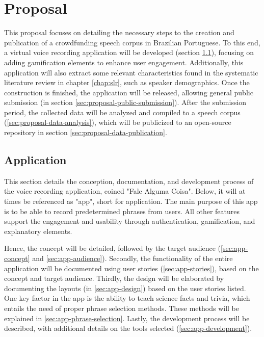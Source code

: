\chapter[Proposal]{Proposal}

This proposal focuses on detailing the necessary steps to the creation and publication of a crowdfunding speech corpus in Brazilian Portuguese. To this end, a virtual voice recording application will be developed (section \ref{sec:proposal-app}), focusing on adding gamification elements to enhance user engagement. Additionally, this application will also extract some relevant characteristics found in the systematic literature review in chapter \ref{chap:slr}, such as speaker demographics. Once the construction is finished, the application will be released, allowing general public submission (in section \ref{sec:proposal-public-submission}). After the submission period, the collected data will be analyzed and compiled to a speech corpus (\ref{sec:proposal-data-analysis}), which will be publicized to an open-source repository in section \ref{sec:proposal-data-publication}.

\section{Application}
\label{sec:proposal-app}

This section details the conception, documentation, and development process of the voice recording application, coined "Fale Alguma Coisa". Below, it will at times be referenced as "app", short for application. The main purpose of this app is to be able to record predetermined phrases from users. All other features support the engagement and usability through authentication, gamification, and explanatory elements. 

Hence, the concept will be detailed, followed by the target audience (\ref{sec:app-concept} and \ref{sec:app-audience}). Secondly, the functionality of the entire application will be documented using user stories (\ref{sec:app-stories}), based on the concept and target audience. Thirdly, the design will be elaborated by documenting the layouts (in \ref{sec:app-design}) based on the user stories listed. One key factor in the app is the ability to teach science facts and trivia, which entails the need of proper phrase selection methods. These methods will be explained in \ref{sec:app-phrase-selection}. Lastly, the development process will be described, with additional details on the tools selected (\ref{sec:app-development}).

